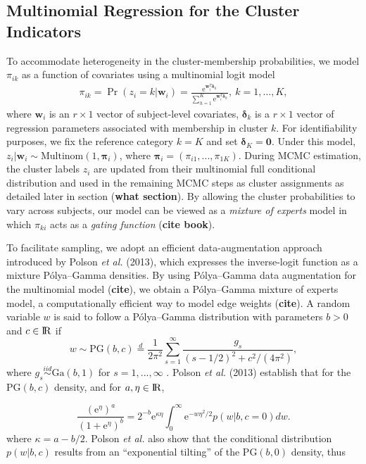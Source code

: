\documentclass[useAMS,referee]{biom}
\begin{document}
\subsection{Multinomial Regression for the Cluster Indicators}
To accommodate heterogeneity in the cluster-membership probabilities, we model $\pi_{ik}$ as a function of covariates using a multinomial logit model 
\begin{eqnarray}
\pi_{ik} = \Pr(z_i = k|\mathbf{w}_i) = \frac{\text{e}^{\mathbf{w}_i^T \boldsymbol\delta_k}}{\sum_{h = 1}^K \text{e}^{\mathbf{w}_i^T \boldsymbol\delta_{h}}},~ k=1,\ldots,K,
\end{eqnarray}
where $\mathbf{w}_i$ is an $r\times 1$ vector of subject-level covariates, $\boldsymbol\delta_k$ is a $r\times 1$ vector of regression parameters associated with membership in cluster $k$. For identifiability purposes, we fix the reference category $k = K$ and set $\boldsymbol\delta_K = \mathbf{0}$. Under this model, $z_i|\mathbf{w}_i \sim \text{Multinom}(1,\boldsymbol\pi_i)$, where $\boldsymbol\pi_i = (\pi_{i1},...,\pi_{1K})$. During MCMC estimation, the cluster labels $z_i$ are updated from their multinomial full conditional distribution and used in the remaining MCMC steps as cluster assignments as detailed later in section (\textbf{what section}). By allowing the cluster probabilities to vary across subjects, our model can be viewed as a \textit{mixture of experts} model in which $\pi_{ki}$ acts as a \textit{gating function} (\textbf{cite book}). 

To facilitate sampling, we adopt an efficient data-augmentation approach introduced by Polson \textit{et al.} (2013), which expresses the inverse-logit function as a mixture P\'olya--Gamma densities. By using P\'olya--Gamma data augmentation for the multinomial model (\textbf{cite}), we obtain a P\'olya--Gamma mixture of experts model, a computationally efficient way to model edge weights (\textbf{cite}). A random variable ${w}$ is said to follow a P\'olya--Gamma distribution with parameters $b > 0$ and $c \in {\rm I\!R}$ if
\begin{equation}
{w} \sim \text{PG}(b,c) \stackrel{d}{=} \frac{1}{2\pi^2}\sum_{s=1}^{\infty}\frac{g_s}{(s-1/2)^2 + c^2/(4\pi^2)}, \label{eq:pg1}
\end{equation}
where $g_s \stackrel{iid}{\sim} \text{Ga}(b,1)$ for $s = 1,...,\infty$ . Polson \textit{et al.} (2013) establish that for the $\text{PG}(b,c)$ density, and for $a,\eta \in {\rm I\!R}$, 

\begin{equation}
\frac{(\text{e}^{\eta})^a}{(1 + \text{e}^{\eta})^b} = 2^{-b}\text{e}^{\kappa \eta} \int_{0}^{\infty} \text{e}^{-{w}\eta^2/2}p({w}|b,c = 0)d{w}. \label{eq:pg2}
\end{equation}
where $\kappa = a - b/2$. Polson \textit{et al.} also show that the conditional distribution $p(w|b,c)$ results from an ``exponential tilting'' of the $\text{PG}(b,0)$ density, thus
\end{document}
